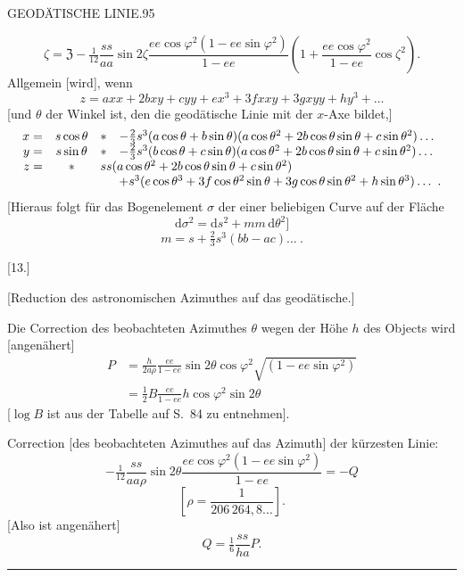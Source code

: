 \clearpage
\noindent\mbox{}\hfill GEODÄTISCHE LINIE.\hfill 95\par
\[
\zeta=\mathfrak Z-\tfrac1{12}\frac{ss}{aa}\sin2\zeta\frac{ee\cos\varphi^2(1-ee\sin\varphi^2)}{1-ee}\left(1+\frac{ee\cos\varphi^2}{1-ee}\cos\zeta^2\right).
\]
Allgemein [wird], wenn
\[
z=axx+2bxy+cyy+ex^3+3fxxy+3gxyy+hy^3+\ldots
\]
[und $\theta$ der Winkel ist, den die geodätische Linie mit der $x$-Axe bildet,]
\[
\begin{array}{rcll}
x=&s\cos\theta&*&-\tfrac23s^3(a\cos\theta+b\sin\theta)(a\cos\theta^2+2b\cos\theta\sin\theta+c\sin\theta^2)\ldots\\
y=&s\sin\theta&*&-\tfrac23s^3(b\cos\theta+c\sin\theta)(a\cos\theta^2+2b\cos\theta\sin\theta+c\sin\theta^2)\ldots\\
z=&*&\multicolumn{2}{l}{ss(a\cos\theta^2+2b\cos\theta\sin\theta+c\sin\theta^2)}\\
&&&+s^3(e\cos\theta^3+3f\cos\theta^2\sin\theta+3g\cos\theta\sin\theta^2+h\sin\theta^3)\ldots\ .
\end{array}
\]
[Hieraus folgt für das Bogenelement $\sigma$ der einer beliebigen Curve auf der Fläche
\[
\mathrm d\sigma^2=\mathrm ds^2+mm\,\mathrm d\theta^2]
\]
\[
m=s+\tfrac23s^3(bb-ac)\ldots\ .
\]
\begin{center}[13.]\end{center}
\begin{center}[Reduction des astronomischen Azimuthes auf das geodätische.]\end{center}
Die Correction des beobachteten Azimuthes $\theta$ wegen der Höhe $h$ des Objects wird [angenähert]
\[
\begin{aligned}
P&=\frac h{2a\rho}\frac{ee}{1-ee}\sin2\theta\cos\varphi^2\sqrt{(1-ee\sin\varphi^2)}\\
&=\tfrac12B\frac{ee}{1-ee}h\cos\varphi^2\sin2\theta
\end{aligned}
\]
[$\log B$ ist aus der Tabelle auf S.\ 84 zu entnehmen].

Correction [des beobachteten Azimuthes auf das Azimuth] der kürzesten Linie:
\[
-\tfrac1{12}\frac{ss}{aa\rho}\sin2\theta\frac{ee\cos\varphi^2(1-ee\sin\varphi^2)}{1-ee}=-Q
\]
\[
\left[\rho=\frac1{206\,264{,}8\ldots}\right].
\]
[Also ist angenähert]
\[
Q=\tfrac16\frac{ss}{ha}P.
\]
\begin{center}\rule{.18\textwidth}{.4pt}\end{center}

